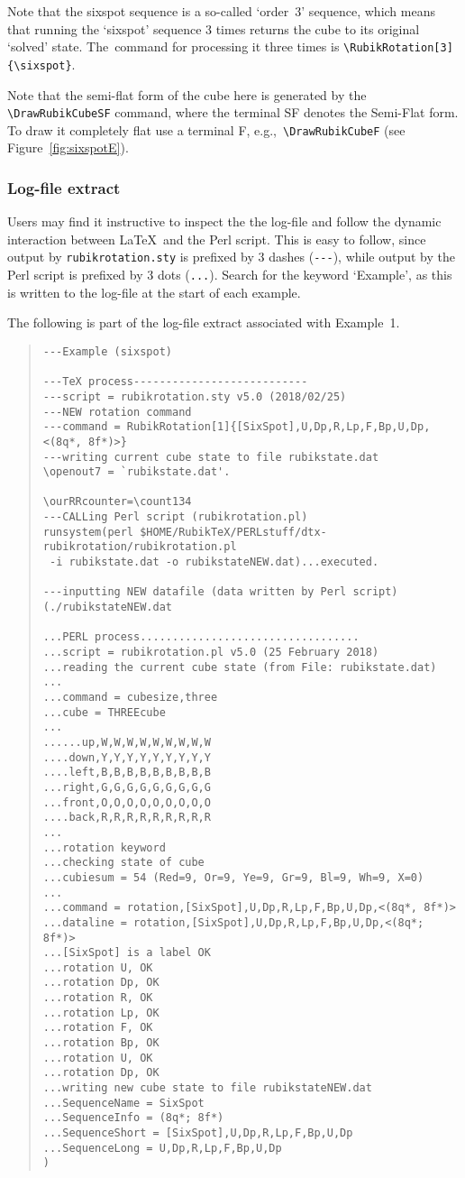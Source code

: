 \documentclass[a4paper]{article}
\begin{document}
Note that the sixspot sequence is a so-called `order~3' sequence, which 
means that running the `sixspot' sequence 3 times returns the cube 
to its original `solved' state. The~command for processing it three 
times is  \verb!\RubikRotation[3]{\sixspot}!.

Note that the semi-flat form of the cube here is generated by the
 \verb!\DrawRubikCubeSF! command, where the terminal SF denotes 
 the Semi-Flat form.  To draw it completely flat use a terminal F, 
 e.g.,~\verb!\DrawRubikCubeF!  (see Figure~\ref{fig:sixspotE}). 

\subsubsection{Log-file extract}
Users may find it instructive to inspect the the log-file and 
follow the dynamic interaction between \LaTeX\  and the Perl script. 
This is easy to follow, since output by \texttt{rubikrotation.sty} 
is prefixed by 3 dashes (\verb!---!), while output by the Perl script 
is prefixed by 3 dots (\verb!...!). Search for the keyword `Example', 
as this is written to the log-file at the start of each example. 

The following is part of the log-file extract associated with Example~1. 

\begin{quote}
\begin{verbatim} 
---Example (sixspot)

---TeX process---------------------------
---script = rubikrotation.sty v5.0 (2018/02/25)
---NEW rotation command
---command = RubikRotation[1]{[SixSpot],U,Dp,R,Lp,F,Bp,U,Dp,<(8q*, 8f*)>}
---writing current cube state to file rubikstate.dat
\openout7 = `rubikstate.dat'.

\ourRRcounter=\count134
---CALLing Perl script (rubikrotation.pl)
runsystem(perl $HOME/RubikTeX/PERLstuff/dtx-rubikrotation/rubikrotation.pl
 -i rubikstate.dat -o rubikstateNEW.dat)...executed.

---inputting NEW datafile (data written by Perl script)
(./rubikstateNEW.dat

...PERL process..................................
...script = rubikrotation.pl v5.0 (25 February 2018)
...reading the current cube state (from File: rubikstate.dat)
...
...command = cubesize,three
...cube = THREEcube
...
......up,W,W,W,W,W,W,W,W,W
....down,Y,Y,Y,Y,Y,Y,Y,Y,Y
....left,B,B,B,B,B,B,B,B,B
...right,G,G,G,G,G,G,G,G,G
...front,O,O,O,O,O,O,O,O,O
....back,R,R,R,R,R,R,R,R,R
...
...rotation keyword
...checking state of cube
...cubiesum = 54 (Red=9, Or=9, Ye=9, Gr=9, Bl=9, Wh=9, X=0)
...
...command = rotation,[SixSpot],U,Dp,R,Lp,F,Bp,U,Dp,<(8q*, 8f*)>
...dataline = rotation,[SixSpot],U,Dp,R,Lp,F,Bp,U,Dp,<(8q*; 8f*)>
...[SixSpot] is a label OK
...rotation U, OK
...rotation Dp, OK 
...rotation R, OK
...rotation Lp, OK
...rotation F, OK
...rotation Bp, OK
...rotation U, OK
...rotation Dp, OK 
...writing new cube state to file rubikstateNEW.dat
...SequenceName = SixSpot
...SequenceInfo = (8q*; 8f*)
...SequenceShort = [SixSpot],U,Dp,R,Lp,F,Bp,U,Dp
...SequenceLong = U,Dp,R,Lp,F,Bp,U,Dp
)
\end{verbatim}
\end{quote}
\end{document}
